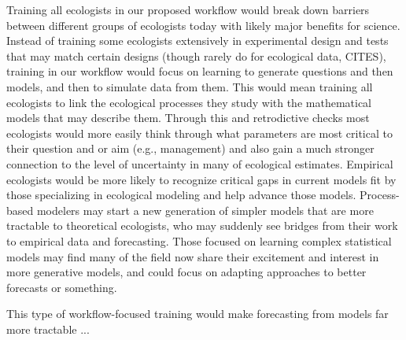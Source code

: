 \documentclass[11pt]{article}
\begin{document}
Training all ecologists in our proposed workflow would break down barriers between different groups of ecologists today with likely major benefits for science. Instead of training some ecologists extensively in experimental design and tests that may match certain designs (though rarely do for ecological data, CITES), training in our workflow would focus on learning to generate questions and then models, and then to simulate data from them. This would mean training all ecologists to link the ecological processes they study with the mathematical models that may describe them. Through this and retrodictive checks most ecologists would more easily think through what parameters are most critical to their question and or aim (e.g., management) and also gain a much stronger connection to the level of uncertainty in many of ecological estimates. Empirical ecologists would be more likely to recognize critical gaps in current models fit by those specializing in ecological modeling and help advance those models. Process-based modelers may start a new generation of simpler models that are more tractable to theoretical ecologists, who may suddenly see bridges from their work to empirical data and forecasting. 
Those focused on learning complex statistical models may find many of the field now share their excitement and interest in more generative models, and could focus on adapting approaches to better forecasts or something.

This type of workflow-focused training would make forecasting from models far more tractable ... 


\end{document}
